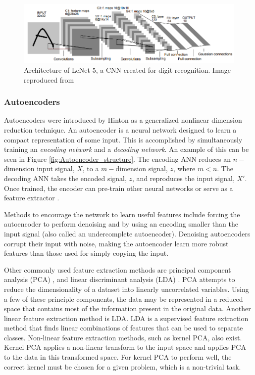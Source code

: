 \begin{figure}[H]
	\centering
	\includegraphics[width=0.85\linewidth]{images/cnn_mnist_lecun98}
	\caption{Architecture of LeNet-5, a CNN created for digit recognition. Image reproduced from \cite{Lecun1998}}
	\label{fig:cnn_mnist_lecun98}
\end{figure}

\subsubsection{Autoencoders} \label{Autoencoders}

Autoencoders were introduced by Hinton \cite{Hinton2006} as a generalized nonlinear dimension reduction technique. An autoencoder is a neural network designed to learn a compact representation of some input. This is accomplished by simultaneously training an \textit{encoding network} and a \textit{decoding network}. An example of this can be seen in Figure \ref{fig:Autoencoder_structure}. The encoding ANN reduces an $n-$dimension input signal, $X$, to a $m-$dimension signal, $z$, where $m < n$. The decoding ANN takes the encoded signal, $z$, and reproduces the input signal, $X'$. Once trained, the encoder can pre-train other neural networks or serve as a feature extractor \cite{Erhan2010,CHARTE2018}. 

Methods to encourage the network to learn useful features include forcing the autoencoder to perform denoising \cite{Vincent2008, Vincent2010} and by using an encoding smaller than the input signal (also called an undercomplete autoencoder). Denoising autoencoders corrupt their input with noise, making the autoencoder learn more robust features than those used for simply copying the input. 


Other commonly used feature extraction methods are principal component analysis (PCA) \cite{Jolliffe2002}, and linear discriminant analysis (LDA) \cite{Welling2007}. PCA attempts to reduce the dimensionality of a dataset into linearly uncorrelated variables. Using a few of these principle components, the data may be represented in a reduced space that contains most of the information present in the original data. Another linear feature extraction method is LDA. LDA is a supervised feature extraction method that finds linear combinations of features that can be used to separate classes. Non-linear feature extraction methods, such as kernel PCA, also exist. Kernel PCA applies a non-linear transform to the input space and applies PCA to the data in this transformed space. For kernel PCA to perform well, the correct kernel must be chosen for a given problem, which is a non-trivial task.

